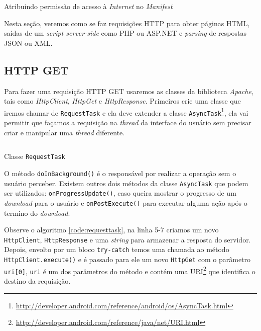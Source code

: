\documentclass[a4paper,12pt,brazil]{book}
\begin{document}
\begin{singlespace}
		\begin{listing}[H]
		\inputminted[linenos=true,fontsize=\small,frame=lines, framesep=2mm, tabsize=2,numbersep=5pt]{xml}{src/api/comm/permission-internet.xml}
		\caption{Atribuindo permissão de acesso à \emph{Internet} no \emph{Manifest}}
		\label{code:permission-internet}
		\end{listing}

		Nesta seção, veremos como se faz requisições HTTP para obter páginas HTML, saídas de um \emph{script server-side} como PHP ou ASP.NET e \emph{parsing} de respostas JSON ou XML.		 

		\subsection{HTTP GET}

		Para fazer uma requisição HTTP GET usaremos as classes da biblioteca \emph{Apache}, tais como \emph{HttpClient}, \emph{HttpGet} e \emph{HttpResponse}. Primeiros crie uma classe que iremos chamar de \texttt{RequestTask} e ela deve extender a classe \texttt{AsyncTask}\footnote{\href{http://developer.android.com/reference/android/os/AsyncTask.html}{http://developer.android.com/reference/android/os/AsyncTask.html}}, ela vai permitir que façamos a requisição na \emph{thread} da interface do usuário sem precisar criar e manipular uma \emph{thread} diferente.

		\begin{listing}[H]
		\inputminted[linenos=true,fontsize=\small,frame=lines, framesep=2mm, tabsize=2,numbersep=5pt]{java}{src/api/comm/asynctask.java}
		\caption{Classe \texttt{RequestTask}}
		\label{code:requesttask}
		\end{listing}

		O método \texttt{doInBackground()} é o responsável por realizar a operação sem o usuário perceber. Existem outros dois métodos da classe \texttt{AsyncTask} que podem ser utilizados: \texttt{onProgressUpdate()}, caso queira mostrar o progresso de um \emph{download} para o usuário e \texttt{onPostExecute()} para executar alguma ação após o termino do \emph{download}.

		Observe o algoritmo \ref{code:requesttask}, na linha 5-7 criamos um novo \texttt{HttpClient}, \texttt{HttpResponse} e uma \emph{string} para armazenar a resposta do servidor. Depois, envolto por um bloco \texttt{try-catch} temos uma chamada ao método \texttt{HttpClient.execute()} e é passado para ele um novo \texttt{HttpGet} com o parâmetro \texttt{uri[0]}, \texttt{uri} é um dos parâmetros do método e contém uma URI\footnote{\href{http://developer.android.com/reference/java/net/URI.html}{http://developer.android.com/reference/java/net/URI.html}} que identifica o destino da requisição.


\end{singlespace}
\end{document}
